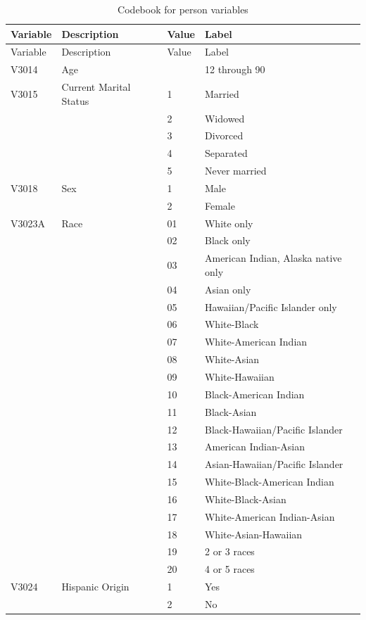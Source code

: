 \documentclass[
]{krantz}
\begin{document}
\begin{longtable}[]{@{}llll@{}}
\caption{\label{tab:cb-pers} Codebook for person variables}\tabularnewline
\toprule\noalign{}
Variable & Description & Value & Label \\
\midrule\noalign{}
\endfirsthead
\toprule\noalign{}
Variable & Description & Value & Label \\
\midrule\noalign{}
\endhead
\bottomrule\noalign{}
\endlastfoot
V3014 & Age & & 12 through 90 \\
V3015 & Current Marital Status & 1 & Married \\
& & 2 & Widowed \\
& & 3 & Divorced \\
& & 4 & Separated \\
& & 5 & Never married \\
V3018 & Sex & 1 & Male \\
& & 2 & Female \\
V3023A & Race & 01 & White only \\
& & 02 & Black only \\
& & 03 & American Indian, Alaska native only \\
& & 04 & Asian only \\
& & 05 & Hawaiian/Pacific Islander only \\
& & 06 & White-Black \\
& & 07 & White-American Indian \\
& & 08 & White-Asian \\
& & 09 & White-Hawaiian \\
& & 10 & Black-American Indian \\
& & 11 & Black-Asian \\
& & 12 & Black-Hawaiian/Pacific Islander \\
& & 13 & American Indian-Asian \\
& & 14 & Asian-Hawaiian/Pacific Islander \\
& & 15 & White-Black-American Indian \\
& & 16 & White-Black-Asian \\
& & 17 & White-American Indian-Asian \\
& & 18 & White-Asian-Hawaiian \\
& & 19 & 2 or 3 races \\
& & 20 & 4 or 5 races \\
V3024 & Hispanic Origin & 1 & Yes \\
& & 2 & No \\
\end{longtable}
\end{document}

